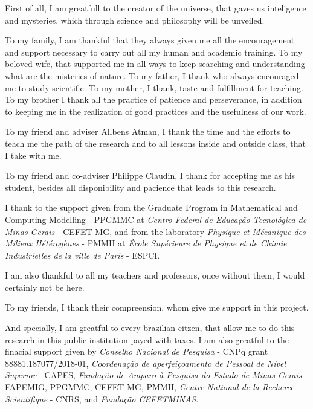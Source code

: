 
\begin{agradecimentos}[Acknowledgements]

First of all, I am greatfull to the creator of the universe, that gaves us inteligence and mysteries, which through science and philosophy will be unveiled.

To my family, I am thankful that they always given me all the encouragement and support necessary to carry out all my human and academic training. To my beloved wife, that supported me in all ways to keep searching and understanding what are the misteries of nature. To my father, I thank who always encouraged me to study scientific. To my mother, I thank, taste and fulfillment for teaching. To my brother I thank all the practice of patience and perseverance, in addition to keeping me in the realization of good practices and the usefulness of our work.

To my friend and adviser Allbens Atman, I thank the time and the efforts to teach me the path of the research and to all lessons inside and outside class, that I take with me.

To my friend and co-adviser Philippe Claudin, I thank for accepting me as his student, besides all disponibility and pacience that leads to this research.

I thank to the support given from the Graduate Program in Mathematical and Computing Modelling - PPGMMC at \textit{Centro Federal de Educação Tecnológica de Minas Gerais} - CEFET-MG, and from the laboratory \textit{Physique et Mécanique des Milieux Hétérogènes} - PMMH at \textit{École Supérieure de Physique et de Chimie Industrielles de la ville de Paris} - ESPCI.

I am also thankful to all my teachers and professors, once without them, I would certainly not be here.

To my friends, I thank their compreension, whom give me support in this project.

And specially, I am greatful to every brazilian citzen, that allow me to do this research in this public institution payed with taxes. I am also greatful to the finacial support given by \textit{Conselho Nacional de Pesquisa} - CNPq grant 88881.187077/2018-01, \textit{Coordenação de aperfeiçoamento de Pessoal de Nível Superior} - CAPES, \textit{Fundação de Amparo à Pesquisa do Estado de Minas Gerais} - FAPEMIG, PPGMMC, CEFET-MG, PMMH, \textit{Centre National de la Recherce Scientifique} - CNRS, and \textit{Fundação CEFETMINAS}.


\end{agradecimentos}

